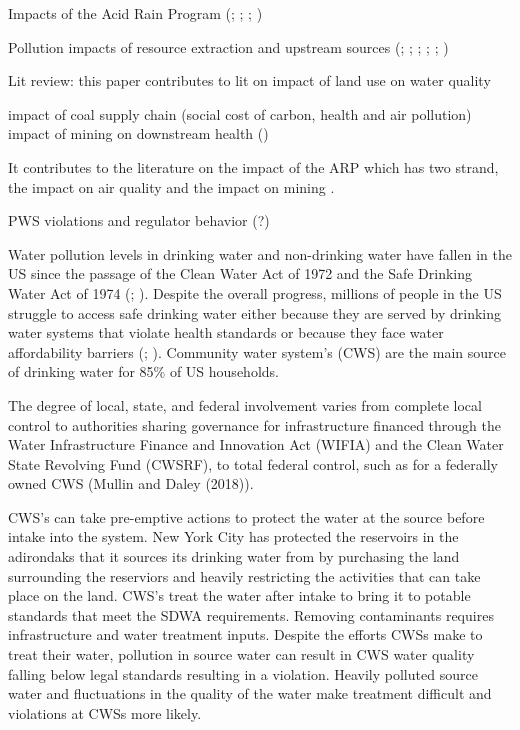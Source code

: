 \documentclass{article}
\begin{document}
Impacts of the Acid Rain Program (\cite{schmalensee2013so2}; \cite{chan2018impact}; \cite{busse2007market}; \cite{li2024effect})
    
Pollution impacts of resource extraction and upstream sources (\cite{aragon2016polluting}; \cite{chu2023air}; \cite{sigman2002international}; \cite{somerville2025impact}; \cite{lutz2013environmental}; 
    \cite{hill2017shale})

Lit review:
this paper contributes to lit on impact of land use on water quality \cite{somerville2025impact}

impact of coal supply chain (social cost of carbon, health and air pollution)
impact of mining on downstream health (\cite{parfitt2024there})

It contributes to the literature on the impact of the ARP which has two strand, the impact on air quality and the impact on mining \cite{li2024effect}.

PWS violations and regulator behavior (?)

Water pollution levels in drinking water and non-drinking water have fallen in the US since the passage of the Clean Water Act of 1972 and the Safe Drinking Water Act of 1974 (\cite{keiser2019us}; \cite{keiser2023us}). Despite the overall progress, millions of people in the US struggle to access safe drinking water either because they are served by drinking water systems that violate health standards or because they face water affordability barriers (\cite{allaire2018national}; \cite{cardoso2022water}). Community water system's (CWS) are the main source of drinking water for 85\% of US households.

The degree of local, state, and federal involvement varies from complete local control to authorities sharing governance for infrastructure financed through the Water Infrastructure Finance and Innovation Act (WIFIA) and the Clean Water State Revolving Fund (CWSRF), to total federal control, such as for a federally owned CWS (Mullin and Daley (2018)). 


CWS's can take pre-emptive actions to protect the water at the source before intake into the system. New York City has protected the reservoirs in the adirondaks that it sources its drinking water from by purchasing the land surrounding the reserviors and heavily restricting the activities that can take place on the land. CWS's treat the water after intake to bring it to potable standards that meet the SDWA requirements. Removing contaminants requires infrastructure and water treatment inputs. Despite the efforts CWSs make to treat their water, pollution in source water can result in CWS water quality falling below legal standards resulting in a violation. Heavily polluted source water and fluctuations in the quality of the water make treatment difficult and violations at CWSs more likely. 
\end{document}
